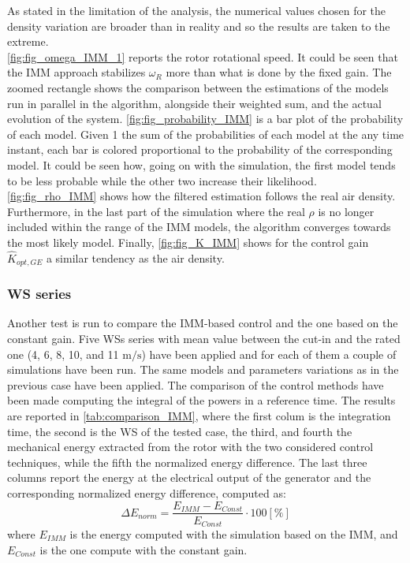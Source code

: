 As stated in the limitation of the analysis, the numerical values chosen for the density variation are broader than in reality and so the results are taken to the extreme. \\
\autoref{fig:fig_omega_IMM_1} reports the rotor rotational speed. It could be seen that the IMM approach stabilizes $\omega_R$ more than what is done by the fixed gain. The zoomed rectangle shows the comparison between the estimations of the models run in parallel in the algorithm, alongside their weighted sum, and the actual evolution of the system. \autoref{fig:fig_probability_IMM} is a bar plot of the probability of each model. Given 1 the sum of the probabilities of each model at the any time instant, each bar is colored proportional to the probability of the corresponding model. It could be seen how, going on with the simulation, the first model tends to be less probable while the other two increase their likelihood. \autoref{fig:fig_rho_IMM} shows how the filtered estimation follows the real air density. Furthermore, in the last part of the simulation where the real $\rho$ is no longer included within the range of the IMM models, the algorithm converges towards the most likely model. Finally, \autoref{fig:fig_K_IMM} shows for the control gain $\hat{K}_{opt,GE}$ a similar tendency as the air density.

\subsubsection{WS series}
Another test is run to compare the IMM-based control and the one based on the constant gain. Five WSs series with mean value between the cut-in and the rated one (4, 6, 8, 10, and 11 $\si{\meter\per\second}$) have been applied and for each of them a couple of simulations have been run. The same models and parameters variations as in the previous case have been applied. The comparison of the control methods have been made computing the integral of the powers in a reference time. The results are reported in \autoref{tab:comparison_IMM}, where the first colum is the integration time, the second is the WS of the tested case, the third, and fourth the mechanical energy extracted from the rotor with the two considered control techniques, while the fifth the normalized energy difference. The last three columns report the energy at the electrical output of the generator and the corresponding normalized energy difference, computed as:
\begin{equation}
  \Delta E_{norm} = \frac{E_{IMM}-E_{Const}}{E_{Const}}\cdot 100 \left[\%\right]
  \label{eq:energy_error}
\end{equation}
where $E_{IMM}$ is the energy computed with the simulation based on the IMM, and $E_{Const}$ is the one compute with the constant gain.

